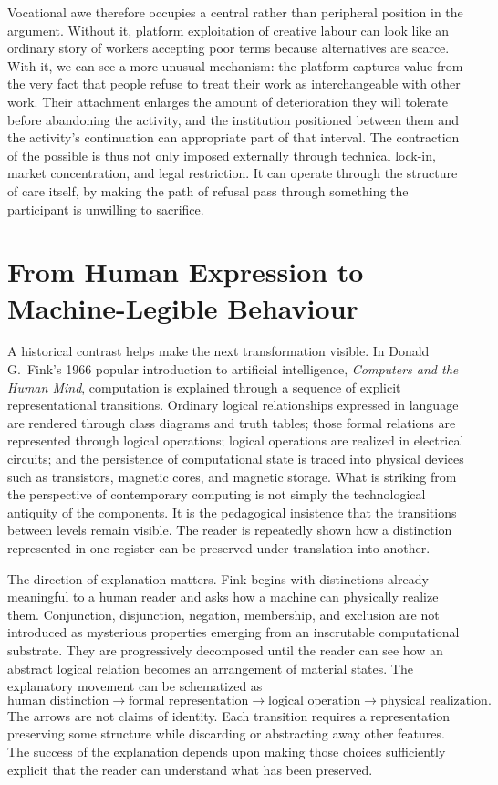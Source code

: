 \documentclass[11pt]{article}
\begin{document}
Vocational awe therefore occupies a central rather than peripheral position in the argument. Without it, platform exploitation of creative labour can look like an ordinary story of workers accepting poor terms because alternatives are scarce. With it, we can see a more unusual mechanism: the platform captures value from the very fact that people refuse to treat their work as interchangeable with other work. Their attachment enlarges the amount of deterioration they will tolerate before abandoning the activity, and the institution positioned between them and the activity's continuation can appropriate part of that interval. The contraction of the possible is thus not only imposed externally through technical lock-in, market concentration, and legal restriction. It can operate through the structure of care itself, by making the path of refusal pass through something the participant is unwilling to sacrifice.

\section{From Human Expression to Machine-Legible Behaviour}

A historical contrast helps make the next transformation visible. In Donald G.\ Fink's 1966 popular introduction to artificial intelligence, \emph{Computers and the Human Mind}, computation is explained through a sequence of explicit representational transitions. Ordinary logical relationships expressed in language are rendered through class diagrams and truth tables; those formal relations are represented through logical operations; logical operations are realized in electrical circuits; and the persistence of computational state is traced into physical devices such as transistors, magnetic cores, and magnetic storage. What is striking from the perspective of contemporary computing is not simply the technological antiquity of the components. It is the pedagogical insistence that the transitions between levels remain visible. The reader is repeatedly shown how a distinction represented in one register can be preserved under translation into another.

The direction of explanation matters. Fink begins with distinctions already meaningful to a human reader and asks how a machine can physically realize them. Conjunction, disjunction, negation, membership, and exclusion are not introduced as mysterious properties emerging from an inscrutable computational substrate. They are progressively decomposed until the reader can see how an abstract logical relation becomes an arrangement of material states. The explanatory movement can be schematized as
\[
\text{human distinction}
\longrightarrow
\text{formal representation}
\longrightarrow
\text{logical operation}
\longrightarrow
\text{physical realization}.
\]
The arrows are not claims of identity. Each transition requires a representation preserving some structure while discarding or abstracting away other features. The success of the explanation depends upon making those choices sufficiently explicit that the reader can understand what has been preserved.
\end{document}
